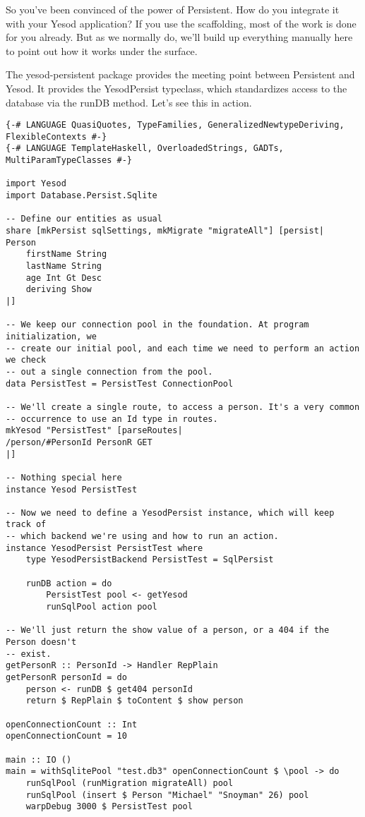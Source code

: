 So you've been convinced of the power of Persistent. How do you integrate it with your Yesod application? If you use the scaffolding, most of the work is done for you already. But as we normally do, we'll build up everything manually here to point out how it works under the surface.

The yesod-persistent package provides the meeting point between Persistent and Yesod. It provides the YesodPersist typeclass, which standardizes access to the database via the runDB method. Let's see this in action.

\begin{lstlisting}
{-# LANGUAGE QuasiQuotes, TypeFamilies, GeneralizedNewtypeDeriving, FlexibleContexts #-}
{-# LANGUAGE TemplateHaskell, OverloadedStrings, GADTs, MultiParamTypeClasses #-}

import Yesod
import Database.Persist.Sqlite

-- Define our entities as usual
share [mkPersist sqlSettings, mkMigrate "migrateAll"] [persist|
Person
    firstName String
    lastName String
    age Int Gt Desc
    deriving Show
|]

-- We keep our connection pool in the foundation. At program initialization, we
-- create our initial pool, and each time we need to perform an action we check
-- out a single connection from the pool.
data PersistTest = PersistTest ConnectionPool

-- We'll create a single route, to access a person. It's a very common
-- occurrence to use an Id type in routes.
mkYesod "PersistTest" [parseRoutes|
/person/#PersonId PersonR GET
|]

-- Nothing special here
instance Yesod PersistTest

-- Now we need to define a YesodPersist instance, which will keep track of
-- which backend we're using and how to run an action.
instance YesodPersist PersistTest where
    type YesodPersistBackend PersistTest = SqlPersist

    runDB action = do
        PersistTest pool <- getYesod
        runSqlPool action pool

-- We'll just return the show value of a person, or a 404 if the Person doesn't
-- exist.
getPersonR :: PersonId -> Handler RepPlain
getPersonR personId = do
    person <- runDB $ get404 personId
    return $ RepPlain $ toContent $ show person

openConnectionCount :: Int
openConnectionCount = 10

main :: IO ()
main = withSqlitePool "test.db3" openConnectionCount $ \pool -> do
    runSqlPool (runMigration migrateAll) pool
    runSqlPool (insert $ Person "Michael" "Snoyman" 26) pool
    warpDebug 3000 $ PersistTest pool
\end{lstlisting}

